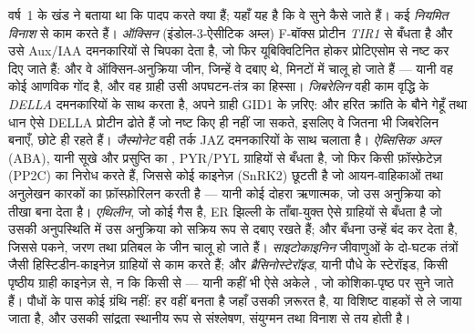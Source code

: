 \begin{definition}[पादप हॉर्मोन और उनके ग्राही]\label{def:b3:plant-molecular-physiology:hormones}
वर्ष~1 के खंड ने बताया था कि पादप  करते क्या हैं; यहाँ यह है कि
वे सुने कैसे जाते हैं। कई \emph{नियमित विनाश} से काम करते हैं।
\emph{ऑक्सिन} (इंडोल-3-ऐसीटिक अम्ल) F-बॉक्स प्रोटीन \emph{TIR1} से
बँधता है और उसे Aux/IAA दमनकारियों से चिपका देता है, जो फिर
यूबिक्विटिनित होकर प्रोटिएसोम से नष्ट कर दिए जाते हैं: और वे
ऑक्सिन-अनुक्रिया जीन, जिन्हें वे दबाए थे, मिनटों में चालू हो जाते हैं
--- यानी वह  कोई आणविक गोंद है, और वह ग्राही उसी अपघटन-तंत्र का
हिस्सा। \emph{जिबरेलिन} वही काम वृद्धि के \emph{DELLA} दमनकारियों के
साथ करता है, अपने ग्राही GID1 के ज़रिए: और हरित क्रांति के बौने गेहूँ
तथा धान ऐसे DELLA प्रोटीन ढोते हैं जो नष्ट किए ही नहीं जा सकते, इसलिए
वे जितना भी जिबरेलिन बनाएँ, छोटे ही रहते हैं। \emph{जैस्मोनेट} वही तर्क
JAZ दमनकारियों के साथ चलाता है। \emph{ऐब्सिसिक अम्ल} (ABA), यानी सूखे
और प्रसुप्ति का , PYR/PYL ग्राहियों से बँधता है, जो फिर किसी
फ़ॉस्फ़ेटेज़ (PP2C) का निरोध करते हैं, जिससे कोई काइनेज़ (SnRK2) छूटती
है जो आयन-वाहिकाओं तथा अनुलेखन कारकों का फ़ॉस्फ़ोरिलन करती है --- यानी
कोई दोहरा ऋणात्मक, जो उस अनुक्रिया को तीखा बना देता है। \emph{एथिलीन},
जो कोई गैस है, ER झिल्ली के ताँबा-युक्त ऐसे ग्राहियों से बँधता है जो
उसकी अनुपस्थिति में उस अनुक्रिया को सक्रिय रूप से दबाए रखते हैं; और
बँधना उन्हें बंद कर देता है, जिससे पकने, जरण तथा प्रतिबल के जीन चालू हो
जाते हैं। \emph{साइटोकाइनिन} जीवाणुओं के दो-घटक तंत्रों जैसी
हिस्टिडीन-काइनेज़ ग्राहियों से काम करते हैं; और
\emph{ब्रैसिनोस्टेरॉइड}, यानी पौधे के स्टेरॉइड, किसी पृष्ठीय ग्राही
काइनेज़ से, न कि किसी  से --- यानी कहीं भी ऐसे अकेले
, जो कोशिका-पृष्ठ पर सुने जाते हैं। पौधों के पास कोई
ग्रंथि नहीं: हर  वहीं बनता है जहाँ उसकी ज़रूरत है, या विशिष्ट
वाहकों से ले जाया जाता है, और उसकी सांद्रता स्थानीय रूप से संश्लेषण,
संयुग्मन तथा विनाश से तय होती है।
\end{definition}

